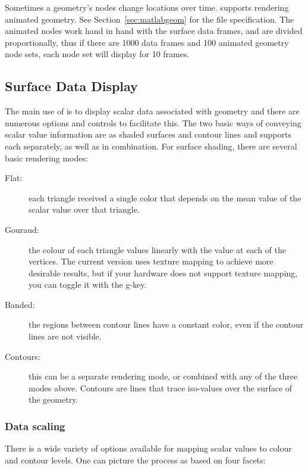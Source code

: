 Sometimes a geometry's nodes change locations over time. \map{} supports rendering
animated geometry.  See Section~\ref{sec:matlabgeom} for the file 
specification.  The animated nodes work hand in hand with the surface data frames,
and are divided proportionally, thus if there are 1000 data frames and 100 animated
geometry node sets, each node set will display for 10 frames.



\subsection{Surface Data Display} 
\label{sec:display-data} 

The main use of \map{} is to display scalar data associated with geometry
and there are numerous options and controls to facilitate this.  The two
basic ways of conveying scalar value information are as shaded surfaces
and contour lines and \map{} supports each separately, as well as in
combination.  For surface shading, there are several basic rendering modes:

\begin{description}
  \item [Flat: ] each triangle received a single color that depends on the
        mean value of the scalar value over that triangle.
  \item [Gouraud: ] the colour of each triangle values linearly with the
        value at each of the vertices.  The current version uses texture
        mapping to achieve more desirable results, but if your hardware
        does not support texture mapping, you can toggle it with the g-key.
  \item [Banded: ] the regions between contour lines have a constant color,
        even if the contour lines are not visible.
  \item [Contours: ] this can be a separate rendering mode, or combined
        with any of the three modes above.  Contours are lines that trace
        iso-values over the surface of the geometry.
\end{description}

\subsubsection{Data scaling}
\label{sec:scaling} 

There is a wide variety of options available for mapping scalar values to
colour and contour levels.  One can picture the process as based on four
facets: 

